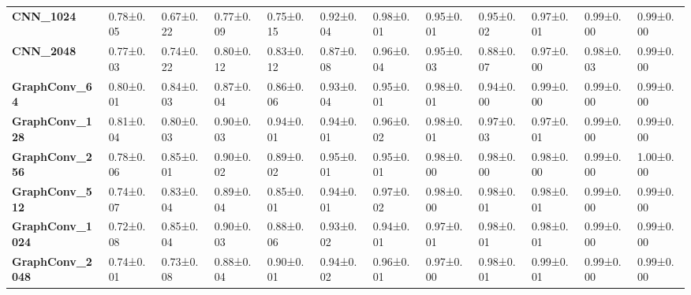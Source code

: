 \begin{tabular}{llllllllllll}
\textbf{CNN\_1024      } &   0.78±0.05 &  0.67±0.22 &  0.77±0.09 &  0.75±0.15 &  0.92±0.04 &  0.98±0.01 &  0.95±0.01 &  0.95±0.02 &  0.97±0.01 &   0.99±0.00 &   0.99±0.00 \\
\textbf{CNN\_2048      } &   0.77±0.03 &  0.74±0.22 &  0.80±0.12 &  0.83±0.12 &  0.87±0.08 &  0.96±0.04 &  0.95±0.03 &  0.88±0.07 &  0.97±0.00 &   0.98±0.03 &   0.99±0.00 \\
\textbf{GraphConv\_64  } &   0.80±0.01 &  0.84±0.03 &  0.87±0.04 &  0.86±0.06 &  0.93±0.04 &  0.95±0.01 &  0.98±0.01 &  0.94±0.00 &  0.99±0.00 &   0.99±0.00 &   0.99±0.00 \\
\textbf{GraphConv\_128 } &   0.81±0.04 &  0.80±0.03 &  0.90±0.03 &  0.94±0.01 &  0.94±0.01 &  0.96±0.02 &  0.98±0.01 &  0.97±0.03 &  0.97±0.01 &   0.99±0.00 &   0.99±0.00 \\
\textbf{GraphConv\_256 } &   0.78±0.06 &  0.85±0.01 &  0.90±0.02 &  0.89±0.02 &  0.95±0.01 &  0.95±0.01 &  0.98±0.00 &  0.98±0.00 &  0.98±0.00 &   0.99±0.00 &   1.00±0.00 \\
\textbf{GraphConv\_512 } &   0.74±0.07 &  0.83±0.04 &  0.89±0.04 &  0.85±0.01 &  0.94±0.01 &  0.97±0.02 &  0.98±0.00 &  0.98±0.01 &  0.98±0.01 &   0.99±0.00 &   0.99±0.00 \\
\textbf{GraphConv\_1024} &   0.72±0.08 &  0.85±0.04 &  0.90±0.03 &  0.88±0.06 &  0.93±0.02 &  0.94±0.01 &  0.97±0.01 &  0.98±0.01 &  0.98±0.01 &   0.99±0.00 &   0.99±0.00 \\
\textbf{GraphConv\_2048} &   0.74±0.01 &  0.73±0.08 &  0.88±0.04 &  0.90±0.01 &  0.94±0.02 &  0.96±0.01 &  0.97±0.00 &  0.98±0.01 &  0.99±0.01 &   0.99±0.00 &   0.99±0.00 \\
\bottomrule
\end{tabular}
